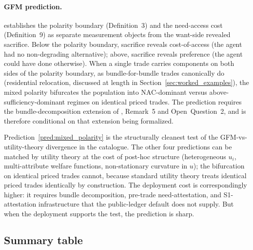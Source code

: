 \paragraph{GFM prediction.}
\citep[Need~Sufficiency]{lasser2026paper8b} establishes the
polarity boundary (Definition~3) and the need-access cost
(Definition~9) as separate measurement objects from the want-side
revealed sacrifice.  Below the polarity boundary, sacrifice
reveals cost-of-access (the agent had no non-degrading
alternative); above, sacrifice reveals preference (the agent could
have done otherwise).  When a single trade carries components
on both sides of the polarity boundary, as bundle-for-bundle
trades canonically do (residential relocation, discussed at length
in Section~\ref{sec:worked_examples}), the mixed polarity
bifurcates the population into NAC-dominant versus
above-sufficiency-dominant regimes on identical priced trades.
The prediction requires the bundle-decomposition extension of
\citep[Revealed~Sacrifice]{lasser2026paper8a},
Remark~5 and Open~Question~2, and is therefore conditional on
that extension being formalized.

\begin{remark}
\label{rem:pred5_clean_test}
Prediction~\ref{pred:mixed_polarity} is the structurally cleanest
test of the GFM-vs-utility-theory divergence in the catalogue.
The other four predictions can be matched by utility theory at the
cost of post-hoc structure (heterogeneous $u_i$, multi-attribute
welfare functions, non-stationary curvature in $u$); the bifurcation
on identical priced trades cannot, because standard utility theory
treats identical priced trades identically by construction.  The
deployment cost is correspondingly higher: it requires bundle
decomposition, pre-trade need-attestation, and S1-attestation
infrastructure that the public-ledger default does not supply.  But
when the deployment supports the test, the prediction is sharp.
\end{remark}

\subsection{Summary table}
\label{sec:pred_summary}

